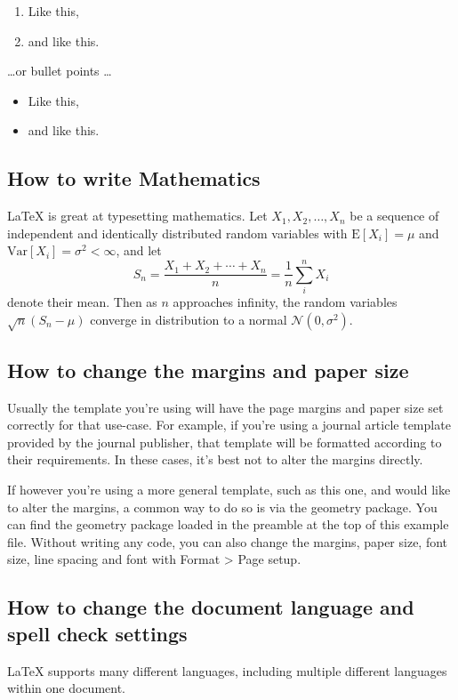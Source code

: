 \documentclass{article}
\begin{document}
\begin{enumerate}
\item Like this,
\item and like this.
\end{enumerate}
\dots or bullet points \dots
\begin{itemize}
\item Like this,
\item and like this.
\end{itemize}

\subsection{How to write Mathematics}

\LaTeX{} is great at typesetting mathematics. Let $X_1, X_2, \ldots, X_n$ be a sequence of independent and identically distributed random variables with $\text{E}[X_i] = \mu$ and $\text{Var}[X_i] = \sigma^2 < \infty$, and let
\[S_n = \frac{X_1 + X_2 + \cdots + X_n}{n}
      = \frac{1}{n}\sum_{i}^{n} X_i\]
denote their mean. Then as $n$ approaches infinity, the random variables $\sqrt{n}(S_n - \mu)$ converge in distribution to a normal $\mathcal{N}(0, \sigma^2)$.


\subsection{How to change the margins and paper size}

Usually the template you're using will have the page margins and paper size set correctly for that use-case. For example, if you're using a journal article template provided by the journal publisher, that template will be formatted according to their requirements. In these cases, it's best not to alter the margins directly.

If however you're using a more general template, such as this one, and would like to alter the margins, a common way to do so is via the geometry package. You can find the geometry package loaded in the preamble at the top of this example file. Without writing any code, you can also change the margins, paper size, font size, line spacing and font with Format > Page setup.

\subsection{How to change the document language and spell check settings}

\LaTeX{} supports many different languages, including multiple different languages within one document.
\end{document}

